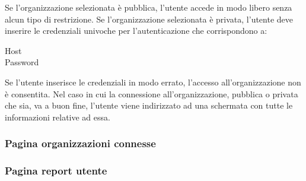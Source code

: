 \documentclass[../manuale-utente.tex]{subfiles}
\begin{document}
Se l'organizzazione selezionata è pubblica, l'utente accede in modo libero senza alcun tipo di restrizione.
Se l'organizzazione selezionata è privata, l'utente deve inserire le credenziali univoche per l'autenticazione  che corrispondono a:
\begin{description}
  \item[Host] %
  \item[Password] %
\end{description}
Se l'utente inserisce le credenziali in modo errato, l'accesso all'organizzazione non è consentita.
Nel caso in cui la connessione all'organizzazione, pubblica o privata che sia, va a buon fine, l'utente viene indirizzato ad una schermata con tutte le informazioni relative ad essa.

\subsubsection{Pagina organizzazioni connesse}%
\label{subs:pagina_organizzazioni_connesse}


\subsubsection{Pagina report utente}%
\label{subs:pagina_report_utente}
\end{document}
